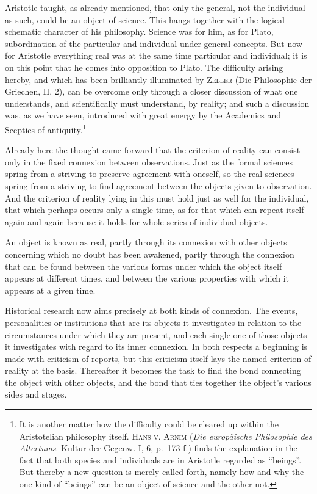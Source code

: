 \documentclass[12pt]{article}
\newcommand{\opage}[1]{\marginnote{\footnotesize\textit{[#1]}}}
\begin{document}
\noindent Aristotle taught, as already mentioned, that only the general, not
the individual as such, could be an object of science. This hangs together
with the logical-schematic character of his philosophy. Science was for him,
as for Plato, subordination of the particular and individual under general
concepts. But now for Aristotle everything real was at the same time
particular and individual; it is on this point that he comes into opposition
to Plato. The difficulty arising hereby, and which has been brilliantly
illuminated \opage{78}by \textsc{Zeller} (Die Philosophie der Griechen, II, 2), can be
overcome only through a closer discussion of what one understands, and
scientifically must understand, by reality; and such a discussion was, as we
have seen, introduced with great energy by the Academics and Sceptics of
antiquity.\footnote{It is another matter how the difficulty could be cleared
up within the Aristotelian philosophy itself. \textsc{Hans v. Arnim}
(\textit{Die europäische Philosophie des Altertums}. Kultur der Gegenw. I,
6, p.~173 f.) finds the explanation in the fact that both species and
individuals are in Aristotle regarded as ``beings''. But thereby a new
question is merely called forth, namely how and why the one kind of
``beings'' can be an object of science and the other not.}

Already here the thought came forward that the criterion of reality can
consist only in the fixed connexion between observations. Just as the formal
sciences spring from a striving to preserve agreement with oneself, so the
real sciences spring from a striving to find agreement between the objects
given to observation. And the criterion of reality lying in this must hold
just as well for the individual, that which perhaps occurs only a single
time, as for that which can repeat itself again and again because it holds
for whole series of individual objects.

An object is known as real, partly through its connexion with other objects
concerning which no doubt has been awakened, partly through the connexion
that can be found between the various forms under which the object itself
appears at different times, and between the various properties with which it
appears at a given time.

Historical research now aims precisely at both kinds of connexion. The
events, personalities or institutions that are its objects it investigates
in relation to the circumstances under which they are present, and each
\opage{79}single one of those objects it investigates with regard to its inner
connexion. In both respects a beginning is made with criticism of reports,
but this criticism itself lays the named criterion of reality at the basis.
Thereafter it becomes the task to find the bond connecting the object with
other objects, and the bond that ties together the object's various sides
and stages.
\end{document}
